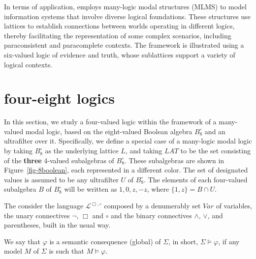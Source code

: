 \documentclass{amsart}
\newcommand{\Lg}{\mathcal{L}}
\begin{document}
In terms of application, \cite{martins_many-logic_2025} employs many-logic modal structures (MLMS) to model information systems that involve diverse logical foundations. These structures use lattices to establish connections between worlds operating in different logics, thereby facilitating the representation of some complex scenarios, including paraconsistent and paracomplete contexts. The framework is illustrated using a six-valued logic of evidence and truth, whose sublattices support a variety of logical contexts.

\section{four-eight logics}\label{sec:four-eight-logics}

In this section, we study a four-valued logic within the framework of a many-valued modal logic, based on the eight-valued Boolean algebra $B_8^\circ$ and an ultrafilter over it. Specifically, we define a special case of a many-logic modal logic by taking $B_8^\circ$ as the underlying lattice $L$, and taking $LAT$ to be the set consisting of the \textbf{three} 4-valued subalgebras of $B_8^\circ$. These subalgebras are shown in Figure~\ref{fig-8boolean}, each represented in a different color. The set of designated values is assumed to be any ultrafilter $U$ of $B_8^\circ$. The elements of each four-valued subalgebra $B$ of $B_8^\circ$ will be written as $1,0,z,-z$, where $\{1,z\}=B\cap U$.

The consider the language $\Lg^{\Box,\circ}$ composed by a denumerably  set $Var$ of variables, the unary connectives  $\neg$, $\Box$ and $\circ$ and the binary connectives $\land$, $\lor$, 
and parentheses, built in the usual way.

We say that $\varphi$ is a semantic consequence (global) of $\Sigma$, in short, $\Sigma \models \varphi$, if any model $M$ of $\Sigma$ is such that $M \vDash \varphi$.
\end{document}
